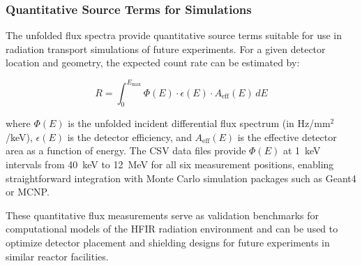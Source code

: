 \subsubsection{Quantitative Source Terms for Simulations}

The unfolded flux spectra provide quantitative source terms suitable for use in radiation transport simulations of future experiments. For a given detector location and geometry, the expected count rate can be estimated by:

\begin{equation}
R = \int_0^{E_{\max}} \Phi(E) \cdot \epsilon(E) \cdot A_{\text{eff}}(E) \, dE
\end{equation}

where $\Phi(E)$ is the unfolded incident differential flux spectrum (in Hz/mm$^2$/keV), $\epsilon(E)$ is the detector efficiency, and $A_{\text{eff}}(E)$ is the effective detector area as a function of energy. The CSV data files provide $\Phi(E)$ at 1~keV intervals from 40~keV to 12~MeV for all six measurement positions, enabling straightforward integration with Monte Carlo simulation packages such as Geant4 or MCNP.

These quantitative flux measurements serve as validation benchmarks for computational models of the HFIR radiation environment and can be used to optimize detector placement and shielding designs for future experiments in similar reactor facilities.
